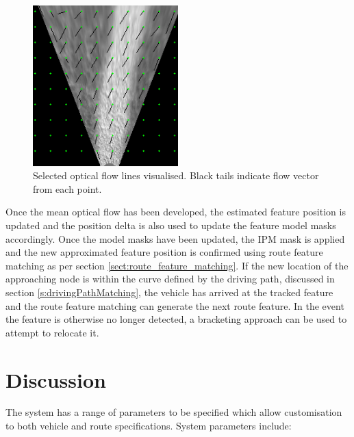 \documentclass[]{aiaa-tc}%
\begin{document}
\begin{figure} %
	\centering
	\includegraphics[width=0.5\textwidth]{FeatureTracking/optical_flow_trails.png}
	\caption{Selected optical flow lines visualised. Black tails indicate flow vector from each point.}
	\label{f:optical_flow_trails}
\end{figure}

Once the mean optical flow has been developed, the estimated feature position is updated and the position delta is also used to update the feature model masks accordingly. Once the model masks have been updated, the IPM mask is applied and the new approximated feature position is confirmed using route feature matching as per section \ref{sect:route_feature_matching}. If the new location of the approaching node is within the curve defined by the driving path, discussed in section \ref{s:drivingPathMatching}, the vehicle has arrived at the tracked feature and the route feature matching can generate the next route feature. In the event the feature is otherwise no longer detected, a bracketing approach can be used to attempt to relocate it.

\section{Discussion}


The system has a range of parameters to be specified which allow customisation to both vehicle and route specifications. System parameters include: 
\end{document}
